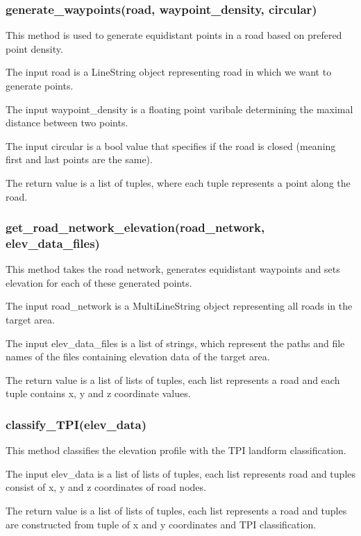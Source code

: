 \documentclass[oneside]{article}
\begin{document}
            \subsubsection{generate\_waypoints(road, waypoint\_density, circular)}
            This method is used to generate equidistant points in a road based on prefered point density.

            The input road is a LineString object representing road in which we want to generate points.

            The input waypoint\_density is a floating point varibale determining the maximal distance between two points.

            The input circular is a bool value that specifies if the road is closed (meaning first and last points are the same).

            The return value is a list of tuples, where each tuple represents a point along the road.

            \subsubsection{get\_road\_network\_elevation(road\_network, elev\_data\_files)}
            This method takes the road network, generates equidistant waypoints and sets elevation for each of these generated points.

            The input road\_network is a MultiLineString object representing all roads in the target area.

            The input elev\_data\_files is a list of strings, which represent the paths and file names of the files containing elevation data of the target area.

            The return value is a list of lists of tuples, each list represents a road and each tuple contains x, y and z coordinate values.

            \subsubsection{classify\_TPI(elev\_data)}
            This method classifies the elevation profile with the TPI landform classification.

            The input elev\_data is a list of lists of tuples, each list represents road and tuples consist of x, y and z coordinates of road nodes.

            The return value is a list of lists of tuples, each list represents a road and tuples are constructed from tuple of x and y coordinates and TPI classification.
\end{document}
